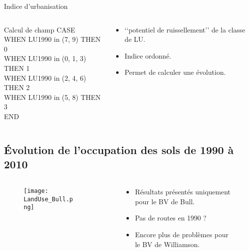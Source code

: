 \documentclass[aspectratio=169]{beamer}
\begin{document}
\begin{frame}{Indice d\rq{}urbanisation}
\begin{columns}
	\begin{column}{0.5\textwidth}
	\begin{block}{Calcul de champ}
	CASE\\
	WHEN LU1990 in (7, 9) THEN 0\\
	WHEN LU1990 in (0, 1, 3) THEN 1\\
	WHEN LU1990 in (2, 4, 6) THEN 2\\
	WHEN LU1990 in (5, 8) THEN 3\\
	END
	\end{block}
	\end{column}
	\begin{column}{0.5\textwidth}
		\begin{itemize}
		\setlength{\itemsep}{10pt}
		\item \lq\lq{}potentiel de ruissellement\rq\rq{} de la classe de LU.
		\item Indice ordonné.
		\item Permet de calculer une évolution.
		\end{itemize}
	\end{column}
\end{columns}
\end{frame}

\subsection{Évolution de l\rq{}occupation des sols de 1990 à 2010}

\begin{frame}
\begin{columns}
	\begin{column}{0.75\textwidth}
	\begin{figure}
	 	\texttt{[image: LandUse\_Bull.png]}
	\end{figure}
	\end{column}
	\begin{column}{0.25\textwidth}
	\begin{figure}
	 	\begin{itemize}
		\item Résultats présentés uniquement pour le BV de Bull.
		\item Pas de routes en 1990 ?
		\item Encore plus de problèmes pour le BV de Williamson.
		\end{itemize}
	\end{figure}
	\end{column}
\end{columns}
\end{frame}
\end{document}
